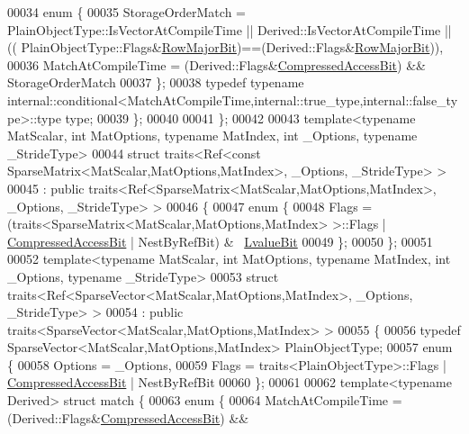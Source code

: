 \begin{DoxyCode}
00034     \textcolor{keyword}{enum} \{
00035       StorageOrderMatch = PlainObjectType::IsVectorAtCompileTime || Derived::IsVectorAtCompileTime || ((
      PlainObjectType::Flags&\hyperlink{group__flags_gae4f56c2a60bbe4bd2e44c5b19cbe8762}{RowMajorBit})==(Derived::Flags&\hyperlink{group__flags_gae4f56c2a60bbe4bd2e44c5b19cbe8762}{RowMajorBit})),
00036       MatchAtCompileTime = (Derived::Flags&\hyperlink{group__flags_gaed0244284da47a2b8661261431173caf}{CompressedAccessBit}) && StorageOrderMatch
00037     \};
00038     \textcolor{keyword}{typedef} \textcolor{keyword}{typename} 
      internal::conditional<MatchAtCompileTime,internal::true\_type,internal::false\_type>::type type;
00039   \};
00040   
00041 \};
00042 
00043 \textcolor{keyword}{template}<\textcolor{keyword}{typename} MatScalar, \textcolor{keywordtype}{int} MatOptions, \textcolor{keyword}{typename} MatIndex, \textcolor{keywordtype}{int} \_Options, \textcolor{keyword}{typename} \_Str\textcolor{keywordtype}{id}eType>
00044 \textcolor{keyword}{struct }traits<Ref<const SparseMatrix<MatScalar,MatOptions,MatIndex>, \_Options, \_StrideType> >
00045   : \textcolor{keyword}{public} traits<Ref<SparseMatrix<MatScalar,MatOptions,MatIndex>, \_Options, \_StrideType> >
00046 \{
00047   \textcolor{keyword}{enum} \{
00048     Flags = (traits<SparseMatrix<MatScalar,MatOptions,MatIndex> >::Flags | 
      \hyperlink{group__flags_gaed0244284da47a2b8661261431173caf}{CompressedAccessBit} | NestByRefBit) & ~\hyperlink{group__flags_gae2c323957f20dfdc6cb8f44428eaec1a}{LvalueBit}
00049   \};
00050 \};
00051 
00052 \textcolor{keyword}{template}<\textcolor{keyword}{typename} MatScalar, \textcolor{keywordtype}{int} MatOptions, \textcolor{keyword}{typename} MatIndex, \textcolor{keywordtype}{int} \_Options, \textcolor{keyword}{typename} \_Str\textcolor{keywordtype}{id}eType>
00053 \textcolor{keyword}{struct }traits<Ref<SparseVector<MatScalar,MatOptions,MatIndex>, \_Options, \_StrideType> >
00054   : \textcolor{keyword}{public} traits<SparseVector<MatScalar,MatOptions,MatIndex> >
00055 \{
00056   \textcolor{keyword}{typedef} SparseVector<MatScalar,MatOptions,MatIndex> PlainObjectType;
00057   \textcolor{keyword}{enum} \{
00058     Options = \_Options,
00059     Flags = traits<PlainObjectType>::Flags | \hyperlink{group__flags_gaed0244284da47a2b8661261431173caf}{CompressedAccessBit} | NestByRefBit
00060   \};
00061 
00062   \textcolor{keyword}{template}<\textcolor{keyword}{typename} Derived> \textcolor{keyword}{struct }match \{
00063     \textcolor{keyword}{enum} \{
00064       MatchAtCompileTime = (Derived::Flags&\hyperlink{group__flags_gaed0244284da47a2b8661261431173caf}{CompressedAccessBit}) && 

\end{DoxyCode}
